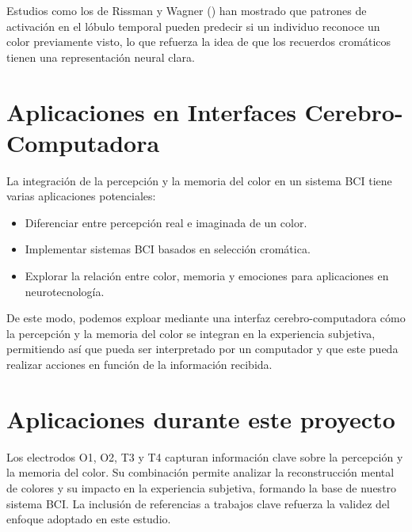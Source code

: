Estudios como los de Rissman y Wagner (\citeyear{Rissman_Wagner_2012}) han mostrado que patrones de activación en el lóbulo temporal pueden predecir si un individuo reconoce un color previamente visto, lo que refuerza la idea de que los recuerdos cromáticos tienen una representación neural clara.

\section{Aplicaciones en Interfaces Cerebro-Computadora}

La integración de la percepción y la memoria del color en un sistema BCI tiene varias aplicaciones potenciales:

\begin{itemize}
    \item Diferenciar entre percepción real e imaginada de un color.
    \item Implementar sistemas BCI basados en selección cromática.
    \item Explorar la relación entre color, memoria y emociones para aplicaciones en neurotecnología.
\end{itemize}

De este modo, podemos exploar mediante una interfaz cerebro-computadora cómo la percepción y la memoria del color se integran en la experiencia subjetiva, permitiendo así que pueda ser interpretado por un computador y que este pueda realizar acciones en función de la información recibida.

\section{Aplicaciones durante este proyecto}
Los electrodos O1, O2, T3 y T4 capturan información clave sobre la percepción y la memoria del color. Su combinación permite analizar la reconstrucción mental de colores y su impacto en la experiencia subjetiva, formando la base de nuestro sistema BCI. La inclusión de referencias a trabajos clave refuerza la validez del enfoque adoptado en este estudio.